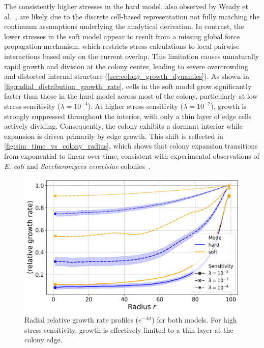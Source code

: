 \documentclass[conference]{IEEEtran}
\begin{document}
The consistently higher stresses in the hard model, also observed by Weady et al.~\cite{Weady2024}, are likely due to the discrete cell-based representation not fully matching the continuum assumptions underlying the analytical derivation. In contrast, the lower stresses in the soft model appear to result from a missing global force propagation mechanism, which restricts stress calculations to local pairwise interactions based only on the current overlap. This limitation causes unnaturally rapid growth and division at the colony center, leading to severe overcrowding and distorted internal structure (\autoref{sec:colony_growth_dynamics}). As shown in \autoref{fig:radial_distribution_growth_rate}, cells in the soft model grow significantly faster than those in the hard model across most of the colony, particularly at low stress-sensitivity ($\lambda = 10^{-4}$). At higher stress-sensitivity ($\lambda = 10^{-2}$), growth is strongly suppressed throughout the interior, with only a thin layer of edge cells actively dividing. Consequently, the colony exhibits a dormant interior while expansion is driven primarily by edge growth. This shift is reflected in \autoref{fig:sim_time_vs_colony_radius}, which shows that colony expansion transitions from exponential to linear over time, consistent with experimental observations of \textit{E. coli} and \textit{Saccharomyces cerevisiae} colonies~\cite{Warren2019,Hallatschek2007,Giometto2018}.


\begin{figure}[H]
    \centering
    \includegraphics[width=\linewidth]{figures/comparison_plots/combined_radial_impedance.png}
    \caption{Radial relative growth rate profiles ($e^{-\lambda \sigma}$) for both models. For high stress-sensitivity, growth is effectively limited to a thin layer at the colony edge.}
    \label{fig:radial_distribution_growth_rate}
\end{figure}
\end{document}
